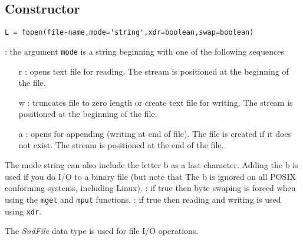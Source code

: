 
\begin{mandesc}
\end{mandesc}

\subsection*{Constructor}
\begin{verbatim}
L = fopen(file-name,mode='string',xdr=boolean,swap=boolean)
\end{verbatim}
\begin{parameters}
  \begin{varlist}
    : the argument \verb+mode+ is a string beginning  with  one  of  the  following  sequences
    \begin{itemize}
      \item[r]: opens text file for reading. The stream is positioned at the beginning of the  file.
      \item[w]: truncates  file  to  zero  length  or create text file for writing.  The stream is
        positioned at the beginning of the file.
      \item[a]: opens for appending (writing at end of file).  The file is created if it does not 
	exist.  The stream is positioned at the end of the file.
    \end{itemize}
    The mode string can also include the letter b as a last character. 
    Adding the b is used if you do I/O to a binary file 
    (but note that The b is ignored on all POSIX conforming systems, including Linux).
    : if true then byte swaping is forced when using the \verb+mget+ and 
    \verb+mput+ functions. 
    : if true then reading and writing is used using \verb+xdr+.
  \end{varlist}
\end{parameters}

\begin{mandescription}
The \emph{SndFile} data type is used for file I/O operations.
\end{mandescription}


